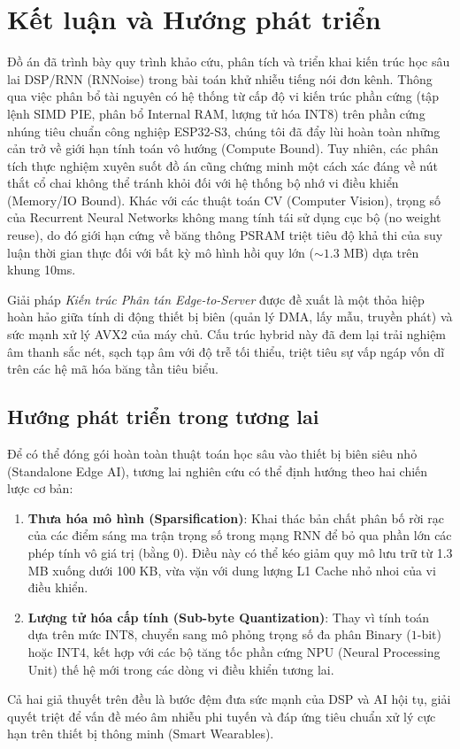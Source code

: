 \section{Kết luận và Hướng phát triển}

Đồ án đã trình bày quy trình khảo cứu, phân tích và triển khai kiến trúc học sâu lai DSP/RNN (RNNoise) trong bài toán khử nhiễu tiếng nói đơn kênh. Thông qua việc phân bổ tài nguyên có hệ thống từ cấp độ vi kiến trúc phần cứng (tập lệnh SIMD PIE, phân bổ Internal RAM, lượng tử hóa INT8) trên phần cứng nhúng tiêu chuẩn công nghiệp ESP32-S3, chúng tôi đã đẩy lùi hoàn toàn những cản trở về giới hạn tính toán vô hướng (Compute Bound). Tuy nhiên, các phân tích thực nghiệm xuyên suốt đồ án cũng chứng minh một cách xác đáng về nút thắt cổ chai không thể tránh khỏi đối với hệ thống bộ nhớ vi điều khiển (Memory/IO Bound). Khác với các thuật toán CV (Computer Vision), trọng số của Recurrent Neural Networks không mang tính tái sử dụng cục bộ (no weight reuse), do đó giới hạn cứng về băng thông PSRAM triệt tiêu độ khả thi của suy luận thời gian thực đối với bất kỳ mô hình hồi quy lớn ($\sim 1.3$ MB) dựa trên khung 10ms.

Giải pháp \textit{Kiến trúc Phân tán Edge-to-Server} được đề xuất là một thỏa hiệp hoàn hảo giữa tính di động thiết bị biên (quản lý DMA, lấy mẫu, truyền phát) và sức mạnh xử lý AVX2 của máy chủ. Cấu trúc hybrid này đã đem lại trải nghiệm âm thanh sắc nét, sạch tạp âm với độ trễ tối thiểu, triệt tiêu sự vấp ngáp vốn dĩ trên các hệ mã hóa băng tần tiêu biểu.

\subsection*{Hướng phát triển trong tương lai}

Để có thể đóng gói hoàn toàn thuật toán học sâu vào thiết bị biên siêu nhỏ (Standalone Edge AI), tương lai nghiên cứu có thể định hướng theo hai chiến lược cơ bản:
\begin{enumerate}
    \item \textbf{Thưa hóa mô hình (Sparsification)}: Khai thác bản chất phân bố rời rạc của các điểm sáng ma trận trọng số trong mạng RNN để bỏ qua phần lớn các phép tính vô giá trị (bằng $0$). Điều này có thể kéo giảm quy mô lưu trữ từ 1.3 MB xuống dưới 100 KB, vừa vặn với dung lượng L1 Cache nhỏ nhoi của vi điều khiển.
    \item \textbf{Lượng tử hóa cấp tính (Sub-byte Quantization)}: Thay vì tính toán dựa trên mức INT8, chuyển sang mô phỏng trọng số đa phân Binary ($1$-bit) hoặc INT4, kết hợp với các bộ tăng tốc phần cứng NPU (Neural Processing Unit) thế hệ mới trong các dòng vi điều khiển tương lai.
\end{enumerate}
Cả hai giả thuyết trên đều là bước đệm đưa sức mạnh của DSP và AI hội tụ, giải quyết triệt để vấn đề méo âm nhiễu phi tuyến và đáp ứng tiêu chuẩn xử lý cực hạn trên thiết bị thông minh (Smart Wearables).
